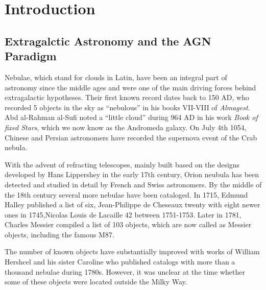
\renewcommand{\thechapter}{1}

\chapter{Introduction}

\section{Extragalctic Astronomy and the AGN Paradigm}
Nebulae, which stand for clouds in Latin, have been an integral part of astronomy since the middle ages and were one of the main driving forces behind extragalactic hypotheses. Their first known record dates back to 150 AD, who recorded 5 objects in the sky as ``nebulous'' in his books VII-VIII  of \textit{Almagest}. Abd al-Rahman al-Sufi noted a ``little cloud'' during 964 AD in his work \textit{Book of fixed Stars}, which we now know as the Andromeda galaxy. On July 4th 1054, Chinese and Persian astronomers have recorded the supernova event of the Crab nebula.

With the advent of refracting telescopes, mainly built based on the designs developed by Hans Lippershey in the early 17th century, Orion neubula has been detected and studied in detail by French and Swiss astronomers. By the middle of the 18th century several more nebulae have been cataloged. In 1715, Edmund Halley published a list of six, Jean-Philippe de Cheseaux twenty with eight newer ones in 1745,Nicolas Louis de Lacaille 42 between 1751-1753. Later in 1781, Charles Messier compiled a list of 103 objects, which are now called as Messier objects, including the famous M87.

The number of known objects have substantially improved with works of William Hershcel and his sister Caroline who published catalogs with more than a thousand nebulae during 1780s. However, it was unclear at the time whether some of these objects were located outside the Milky Way. 
